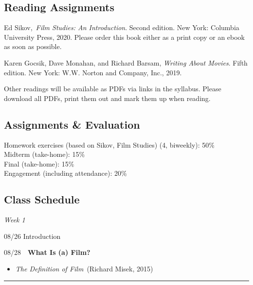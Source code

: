 \documentclass[
  letterpaper,
  DIV=11,
  numbers=noendperiod,
  oneside]{scrartcl}
\providecommand{\tightlist}{%
  \setlength{\itemsep}{0pt}\setlength{\parskip}{0pt}}
\begin{document}
\subsection{Reading Assignments}\label{reading-assignments}

Ed Sikov,~\emph{Film Studies: An Introduction}. Second edition. New
York: Columbia University Press, 2020. Please order this book either as
a print copy or an ebook as soon as possible.

Karen Gocsik, Dave Monahan, and Richard Barsam, \emph{Writing About
Movies}. Fifth edition. New York: W.W. Norton and Company, Inc., 2019.

Other readings will be available as PDFs via links in the syllabus.
Please download all PDFs, print them out and mark them up when reading.

\subsection{Assignments \& Evaluation}\label{assignments-evaluation}

Homework exercises (based on Sikov, Film Studies) (4, biweekly): 50\%\\
Midterm (take-home): 15\%\\
Final (take-home): 15\%\\
Engagement (including attendance): 20\%

\subsection{Class Schedule}\label{class-schedule}

\emph{Week 1}

08/26 Introduction


08/28~~\textbf{What Is (a) Film?}

\begin{itemize}
\tightlist
\item
  \emph{The Definition of Film}~(Richard Misek, 2015)
\end{itemize}

\begin{center}\rule{0.5\linewidth}{0.5pt}\end{center}
\end{document}
